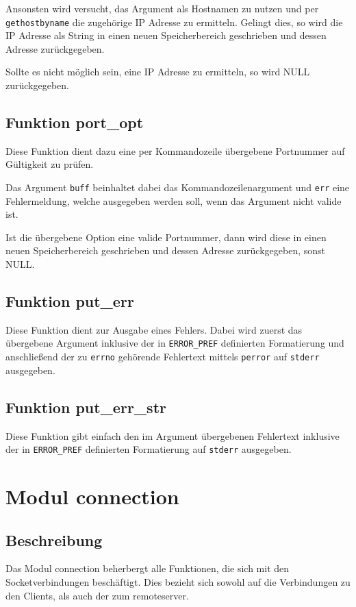 \documentclass[pdftex,final,a4paper,10pt,notitlepage,halfparskip]{scrreprt}
\begin{document}
Ansonsten wird versucht, das Argument als Hostnamen zu nutzen und per \texttt{gethostbyname} die zugehörige IP Adresse zu ermitteln. Gelingt dies, so wird die IP Adresse als String in einen neuen Speicherbereich geschrieben und dessen Adresse zurückgegeben.

Sollte es nicht möglich sein, eine IP Adresse zu ermitteln, so wird NULL zurückgegeben.
\subsection{Funktion port\_opt}\label{fn:port_opt}
Diese Funktion dient dazu eine per Kommandozeile übergebene Portnummer auf Gültigkeit zu prüfen.

Das Argument \texttt{buff} beinhaltet dabei das Kommandozeilenargument und \texttt{err} eine Fehlermeldung, welche ausgegeben werden soll, wenn das Argument nicht valide ist.

Ist die übergebene Option eine valide Portnummer, dann wird diese in einen neuen Speicherbereich geschrieben und dessen Adresse zurückgegeben, sonst NULL.

\subsection{Funktion put\_err}\label{fn:put_err}
Diese Funktion dient zur Ausgabe eines Fehlers. Dabei wird zuerst das übergebene Argument inklusive der in \texttt{ERROR\_PREF} definierten Formatierung und anschließend der zu \texttt{errno} gehörende Fehlertext mittels \texttt{perror} auf \texttt{stderr} ausgegeben.

\subsection{Funktion put\_err\_str}\label{fn:put_err_str}
Diese Funktion gibt einfach den im Argument übergebenen Fehlertext inklusive der in \texttt{ERROR\_PREF} definierten Formatierung auf \texttt{stderr} ausgegeben.

\section{Modul connection}\label{mod:connection}
\subsection{Beschreibung}
Das Modul connection beherbergt alle Funktionen, die sich mit den Socketverbindungen beschäftigt. Dies bezieht sich sowohl auf die Verbindungen zu den Clients, als auch der zum remoteserver.
\end{document}
